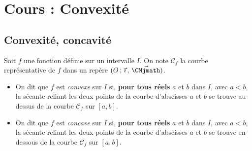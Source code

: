 \documentclass[11pt,fleqn, openany]{book} %
\begin{document}


\chapter{Cours : Convexité}



\section{Convexité, concavité}

\begin{definition}Soit $f$ une fonction définie sur un intervalle $I$. On note $\mathcal{C}_f$ la courbe représentative de $f$ dans un repère $\Oij$.
\begin{itemize}
\item On dit que $f$ est \textit{convexe} sur $I$ si, \textbf{pour tous réels} $a$ et $b$ dans $I$, avec $a<b$, la sécante reliant les deux points de la courbe d'abscisses $a$ et $b$ se trouve au-dessus de la courbe $\mathcal{C}_f$ sur $[a,b]$.
\item On dit que $f$ est \textit{concave} sur $I$ si,  \textbf{pour tous réels} $a$ et $b$ dans $I$, avec $a<b$, la sécante reliant les deux points de la courbe d'abscisses $a$ et $b$ se trouve en-dessous de la courbe $\mathcal{C}_f$ sur $[a,b]$.
\end{itemize}\end{definition}
\end{document}
